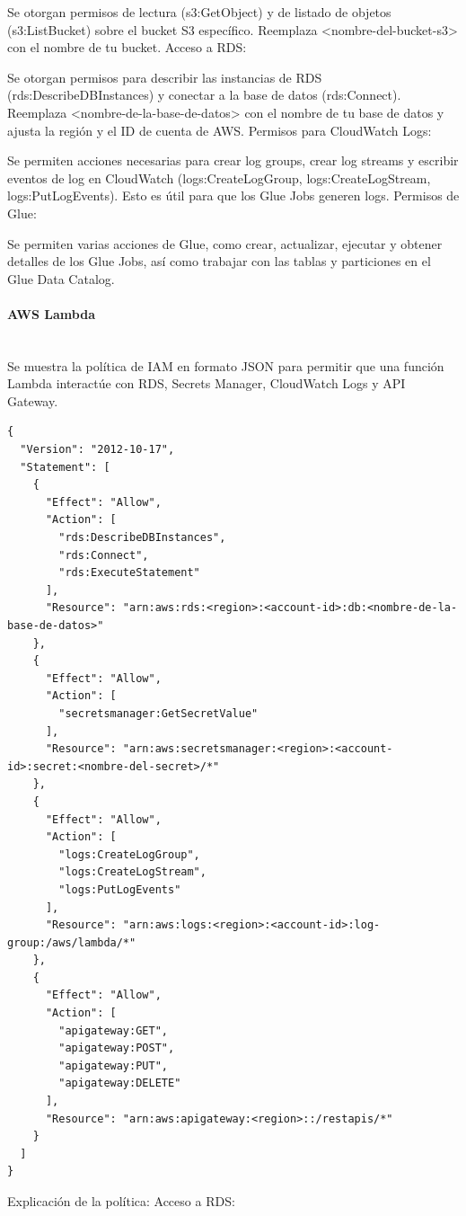 \documentclass{article}
\begin{document}
Se otorgan permisos de lectura (s3:GetObject) y de listado de objetos (s3:ListBucket) sobre el bucket S3 específico. Reemplaza <nombre-del-bucket-s3> con el nombre de tu bucket.
Acceso a RDS:

Se otorgan permisos para describir las instancias de RDS (rds:DescribeDBInstances) y conectar a la base de datos (rds:Connect). Reemplaza <nombre-de-la-base-de-datos> con el nombre de tu base de datos y ajusta la región y el ID de cuenta de AWS.
Permisos para CloudWatch Logs:

Se permiten acciones necesarias para crear log groups, crear log streams y escribir eventos de log en CloudWatch (logs:CreateLogGroup, logs:CreateLogStream, logs:PutLogEvents). Esto es útil para que los Glue Jobs generen logs.
Permisos de Glue:

Se permiten varias acciones de Glue, como crear, actualizar, ejecutar y obtener detalles de los Glue Jobs, así como trabajar con las tablas y particiones en el Glue Data Catalog.



\paragraph{AWS Lambda} \mbox{} \\

Se muestra la política de IAM en formato JSON para permitir que una función Lambda interactúe con RDS, Secrets Manager, CloudWatch Logs y API Gateway.
\begin{verbatim}
{
  "Version": "2012-10-17",
  "Statement": [
    {
      "Effect": "Allow",
      "Action": [
        "rds:DescribeDBInstances",
        "rds:Connect",
        "rds:ExecuteStatement"
      ],
      "Resource": "arn:aws:rds:<region>:<account-id>:db:<nombre-de-la-base-de-datos>"
    },
    {
      "Effect": "Allow",
      "Action": [
        "secretsmanager:GetSecretValue"
      ],
      "Resource": "arn:aws:secretsmanager:<region>:<account-id>:secret:<nombre-del-secret>/*"
    },
    {
      "Effect": "Allow",
      "Action": [
        "logs:CreateLogGroup",
        "logs:CreateLogStream",
        "logs:PutLogEvents"
      ],
      "Resource": "arn:aws:logs:<region>:<account-id>:log-group:/aws/lambda/*"
    },
    {
      "Effect": "Allow",
      "Action": [
        "apigateway:GET",
        "apigateway:POST",
        "apigateway:PUT",
        "apigateway:DELETE"
      ],
      "Resource": "arn:aws:apigateway:<region>::/restapis/*"
    }
  ]
}
\end{verbatim}
Explicación de la política:
Acceso a RDS:
\end{document}
